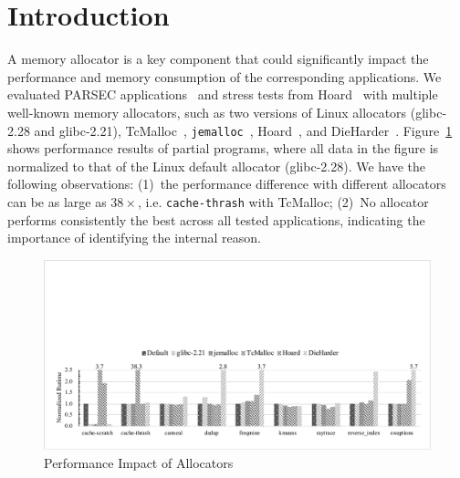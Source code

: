 

\section{Introduction}
\label{sec:intro}

A memory allocator is a key component that could significantly impact the performance and memory consumption of the corresponding applications. We evaluated PARSEC applications~\cite{parsec} and stress tests from Hoard~\cite{Hoard} with multiple well-known memory allocators, such as two versions of Linux allocators (glibc-2.28 and glibc-2.21), TcMalloc~\cite{tcmalloc}, \texttt{jemalloc}~\cite{jemalloc},  Hoard~\cite{Hoard}, and DieHarder~\cite{DieHarder}. Figure~\ref{fig:motivation} shows performance results of partial programs, where all data in the figure is normalized to that of the Linux default allocator (glibc-2.28). We have the following observations: (1)~the performance difference with different allocators can be as large as $38\times$, i.e. \texttt{cache-thrash} with TcMalloc; (2)~No allocator performs consistently the best across all tested applications, indicating the importance of identifying the internal reason.

\begin{figure}[!ht]
\centering
\includegraphics[width=0.98\columnwidth]{figures/motivation}
\caption{Performance Impact of Allocators\label{fig:motivation}}
\end{figure}


